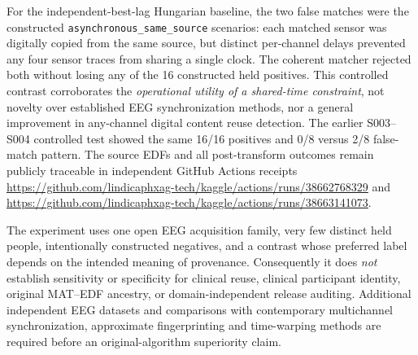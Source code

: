 For the independent-best-lag Hungarian baseline, the two false matches
were the constructed \texttt{asynchronous\_same\_source} scenarios:
each matched sensor was digitally copied from the same source, but
distinct per-channel delays prevented any four sensor traces from
sharing a single clock. The coherent matcher rejected both without
losing any of the 16 constructed held positives. This controlled
contrast corroborates the \emph{operational utility of a shared-time
constraint}, not novelty over established EEG synchronization methods,
nor a general improvement in any-channel digital content reuse
detection. The earlier S003--S004 controlled test showed the same
16/16 positives and 0/8 versus 2/8 false-match pattern. The source
EDFs and all post-transform outcomes remain publicly traceable in
independent GitHub Actions receipts
\url{https://github.com/lindicaphxag-tech/kaggle/actions/runs/38662768329}
and
\url{https://github.com/lindicaphxag-tech/kaggle/actions/runs/38663141073}.

The experiment uses one open EEG acquisition family, very few distinct
held people, intentionally constructed negatives, and a contrast
whose preferred label depends on the intended meaning of provenance.
Consequently it does \emph{not} establish sensitivity or specificity
for clinical reuse, clinical participant identity, original MAT--EDF
ancestry, or domain-independent release auditing. Additional independent
EEG datasets and comparisons with contemporary multichannel
synchronization, approximate fingerprinting and time-warping methods
are required before an original-algorithm superiority claim.
